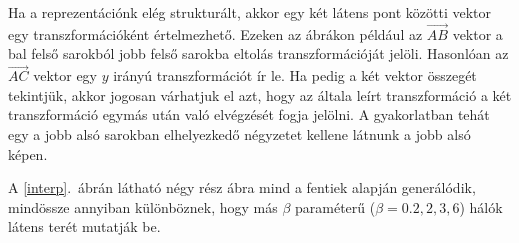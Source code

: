 Ha a reprezentációnk elég strukturált, akkor egy két látens pont közötti vektor egy transzformációként értelmezhető. Ezeken az ábrákon például az $\vec{AB}$ vektor a bal felső sarokból jobb felső sarokba eltolás transzformációját jelöli. Hasonlóan az $\vec{AC}$ vektor egy $y$ irányú transzformációt ír le. Ha pedig a két vektor összegét tekintjük, akkor jogosan várhatjuk el azt, hogy az általa leírt transzformáció a két transzformáció egymás után való elvégzését fogja jelölni. A gyakorlatban tehát egy a jobb alsó sarokban elhelyezkedő négyzetet kellene látnunk a jobb alsó képen.

A \ref{interp}.~ábrán látható négy rész ábra mind a fentiek alapján generálódik, mindössze annyiban különböznek, hogy más $\beta$ paraméterű ($\beta=0.2, 2,3,6$) hálók látens terét mutatják be. 

\begin{figure}[h!]
\begin{center}
  

\end{center}
\end{figure}
